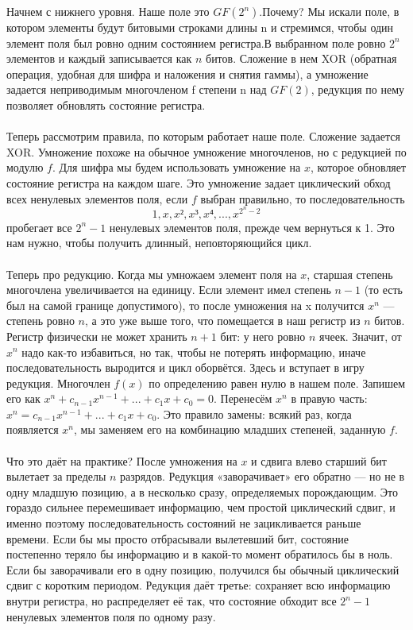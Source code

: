 \documentclass{article}
\begin{document}
Начнем с нижнего уровня. Наше поле это $GF(2^n)$.Почему? Мы искали поле, в котором элементы будут битовыми строками длины n и стремимся, чтобы один элемент поля был ровно одним состоянием регистра.В выбранном поле ровно $2^n$ элементов и каждый записывается как $n$ битов. Сложение в нем  XOR (обратная операция, удобная для шифра и наложения и снятия гаммы), а умножение задается неприводимым многочленом f степени n над  $GF(2)$, редукция по нему позволяет обновлять состояние регистра.
\\
\\Теперь рассмотрим правила, по которым работает наше поле.
Сложение задается XOR. Умножение похоже на обычное умножение многочленов, но с редукцией по модулю $f$. Для шифра мы будем использовать умножение на $x$, которое обновляет состояние регистра на каждом шаге. Это умножение задает циклический обход всех ненулевых элементов поля, если  $f$ выбран правильно, то  последовательность
$$1, x, x², x³, x⁴, ..., x^{2^{n} − 2}$$
пробегает все $2^{n} - 1$ ненулевых элементов поля, прежде чем вернуться к 1. Это нам нужно, чтобы получить длинный, неповторяющийся цикл.
\\
\\
Теперь про редукцию. Когда мы умножаем элемент поля на $x$, старшая степень многочлена увеличивается на единицу. Если элемент имел степень $n - 1$ (то есть был на самой границе допустимого), то после умножения на x получится $x^n$ — степень ровно $n$, а это уже выше того, что помещается в наш регистр из $n$ битов. Регистр физически не может хранить $n + 1$ бит: у него ровно $n$ ячеек. Значит, от $x^n$ надо как-то избавиться, но так, чтобы не потерять информацию, иначе последовательность выродится и цикл оборвётся.
Здесь и вступает в игру редукция. Многочлен $f(x)$ по определению равен нулю в нашем поле. Запишем его как $x^n + c_{n-1} x^{n-1} + ... + c_1 x + c_0 = 0$. Перенесём $x^n$ в правую часть: $x^n = c_{n-1} x^{n-1} + ... + c_1 x + c_0$. Это правило замены: всякий раз, когда появляется $x^n$, мы заменяем его на комбинацию младших степеней, заданную $f$.
\\
\\
Что это даёт на практике? После умножения на $x$ и сдвига влево старший бит вылетает за пределы $n$ разрядов. Редукция «заворачивает» его обратно — но не в одну младшую позицию, а в несколько сразу, определяемых порождающим. Это гораздо сильнее перемешивает информацию, чем простой циклический сдвиг, и именно поэтому последовательность состояний не зацикливается раньше времени. Если бы мы просто отбрасывали вылетевший бит, состояние постепенно теряло бы информацию и в какой-то момент обратилось бы в ноль. Если бы заворачивали его в одну позицию, получился бы обычный циклический сдвиг с коротким периодом. Редукция даёт третье: сохраняет всю информацию внутри регистра, но распределяет её так, что состояние обходит все $2^{n} - 1$ ненулевых элементов поля по одному разу.
\end{document}
